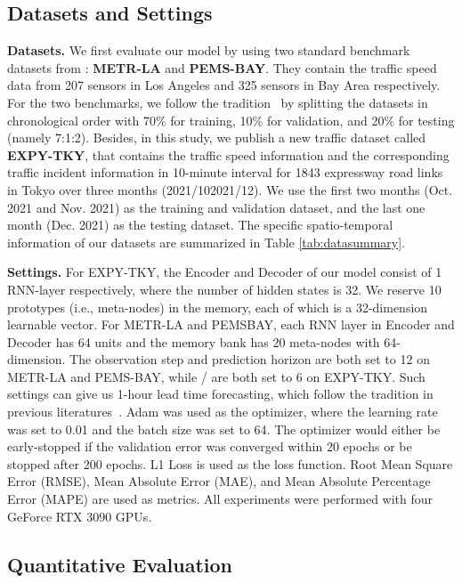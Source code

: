 \documentclass[letterpaper]{article} \usepackage{aaai23}  \usepackage{times}  \usepackage{helvet}  \usepackage{courier}  \usepackage[hyphens]{url}  \usepackage{graphicx} \urlstyle{rm} \def\UrlFont{\rm}  \usepackage{natbib}  \usepackage{caption} \usepackage{multirow}
\begin{document}
\subsection{Datasets and Settings}\label{sec:experiment-setup}
\noindent\textbf{Datasets.} We first evaluate our model by using two standard benchmark datasets from \cite{li2018diffusion}: \textbf{METR-LA} and \textbf{PEMS-BAY}. They contain the traffic speed data from 207 sensors in Los Angeles and 325 sensors in Bay Area respectively. For the two benchmarks, we follow the tradition~\cite{li2018diffusion,wu2019graph,shang2021discrete,lee2021learning} by splitting the datasets in chronological order with 70\% for training, 10\% for validation, and 20\% for testing (namely 7:1:2). Besides, in this study, we publish a new traffic dataset called \textbf{EXPY-TKY}, that contains the traffic speed information and the corresponding traffic incident information in 10-minute interval for 1843 expressway road links in Tokyo over three months (2021/102021/12). We use the first two months (Oct. 2021 and Nov. 2021) as the training and validation dataset, and the last one month (Dec. 2021) as the testing dataset. The specific spatio-temporal information of our datasets are summarized in Table \ref{tab:datasummary}. 


\noindent\textbf{Settings.}
For EXPY-TKY, the Encoder and Decoder of our model consist of 1 RNN-layer respectively, where the number of hidden states is 32. We reserve 10 prototypes (i.e., meta-nodes) in the memory, each of which is a 32-dimension learnable vector. For METR-LA and PEMSBAY, each RNN layer in Encoder and Decoder has 64 units and the memory bank has 20 meta-nodes with 64-dimension. The observation step  and prediction horizon  are both set to 12 on METR-LA and PEMS-BAY, while / are both set to 6 on EXPY-TKY. Such settings can give us 1-hour lead time forecasting, which follow the tradition in previous literatures~\cite{yu2018spatio,li2018diffusion,wu2019graph,bai2020adaptive,shang2021discrete}. Adam was used as the optimizer, where the learning rate was set to 0.01 and the batch size was set to 64. The optimizer would either be early-stopped if the validation error was converged within 20 epochs or be stopped after 200 epochs. L1 Loss is used as the loss function. Root Mean Square Error (RMSE), Mean Absolute Error (MAE), and Mean Absolute Percentage Error (MAPE) are used as metrics. All experiments were performed with four GeForce RTX 3090 GPUs. 


\subsection{Quantitative Evaluation}\label{sec:experiment-overall}
\end{document}
